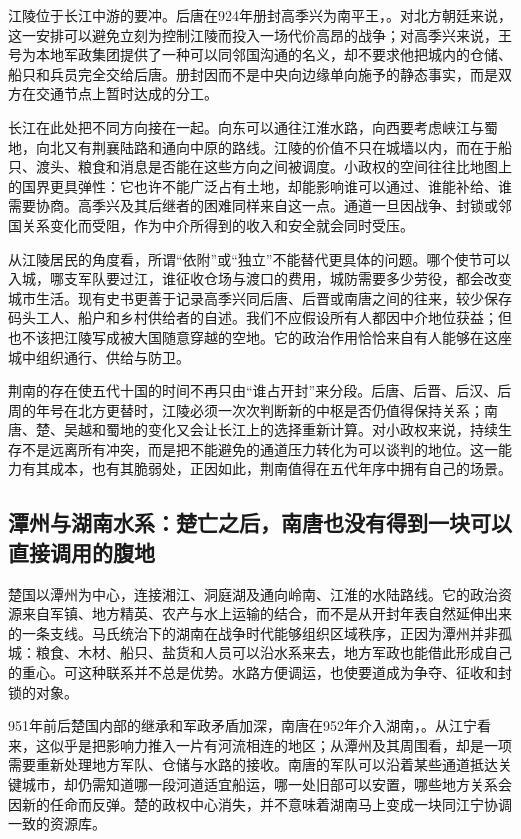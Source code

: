 江陵位于长江中游的要冲。后唐在924年册封高季兴为南平王，。对北方朝廷来说，这一安排可以避免立刻为控制江陵而投入一场代价高昂的战争；对高季兴来说，王号为本地军政集团提供了一种可以同邻国沟通的名义，却不要求他把城内的仓储、船只和兵员完全交给后唐。册封因而不是中央向边缘单向施予的静态事实，而是双方在交通节点上暂时达成的分工。

长江在此处把不同方向接在一起。向东可以通往江淮水路，向西要考虑峡江与蜀地，向北又有荆襄陆路和通向中原的路线。江陵的价值不只在城墙以内，而在于船只、渡头、粮食和消息是否能在这些方向之间被调度。小政权的空间往往比地图上的国界更具弹性：它也许不能广泛占有土地，却能影响谁可以通过、谁能补给、谁需要协商。高季兴及其后继者的困难同样来自这一点。通道一旦因战争、封锁或邻国关系变化而受阻，作为中介所得到的收入和安全就会同时受压。

从江陵居民的角度看，所谓“依附”或“独立”不能替代更具体的问题。哪个使节可以入城，哪支军队要过江，谁征收仓场与渡口的费用，城防需要多少劳役，都会改变城市生活。现有史书更善于记录高季兴同后唐、后晋或南唐之间的往来，较少保存码头工人、船户和乡村供给者的自述。我们不应假设所有人都因中介地位获益；但也不该把江陵写成被大国随意穿越的空地。它的政治作用恰恰来自有人能够在这座城中组织通行、供给与防卫。

荆南的存在使五代十国的时间不再只由“谁占开封”来分段。后唐、后晋、后汉、后周的年号在北方更替时，江陵必须一次次判断新的中枢是否仍值得保持关系；南唐、楚、吴越和蜀地的变化又会让长江上的选择重新计算。对小政权来说，持续生存不是远离所有冲突，而是把不能避免的通道压力转化为可以谈判的地位。这一能力有其成本，也有其脆弱处，正因如此，荆南值得在五代年序中拥有自己的场景。

\subsection{潭州与湖南水系：楚亡之后，南唐也没有得到一块可以直接调用的腹地}

楚国以潭州为中心，连接湘江、洞庭湖及通向岭南、江淮的水陆路线。它的政治资源来自军镇、地方精英、农产与水上运输的结合，而不是从开封年表自然延伸出来的一条支线。马氏统治下的湖南在战争时代能够组织区域秩序，正因为潭州并非孤城：粮食、木材、船只、盐货和人员可以沿水系来去，地方军政也能借此形成自己的重心。可这种联系并不总是优势。水路方便调运，也使要道成为争夺、征收和封锁的对象。

951年前后楚国内部的继承和军政矛盾加深，南唐在952年介入湖南，。从江宁看来，这似乎是把影响力推入一片有河流相连的地区；从潭州及其周围看，却是一项需要重新处理地方军队、仓储与水路的接收。南唐的军队可以沿着某些通道抵达关键城市，却仍需知道哪一段河道适宜船运，哪一处旧部可以安置，哪些地方关系会因新的任命而反弹。楚的政权中心消失，并不意味着湖南马上变成一块同江宁协调一致的资源库。

